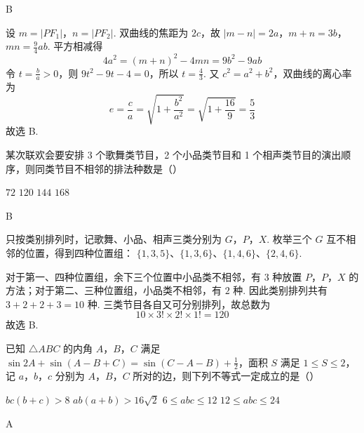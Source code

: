 \begin{answer}
B
\end{answer}

\begin{solution}
设 \(m=|PF_{1}|\)，\(n=|PF_{2}|\). 双曲线的焦距为 \(2c\)，故
\(|m-n|=2a\)，\(m+n=3b\)，\(mn=\frac{9}{4}ab\).
平方相减得
\[
4a^{2}=(m+n)^{2}-4mn=9b^{2}-9ab
\]
令 \(t=\frac{b}{a}>0\)，则 \(9t^{2}-9t-4=0\)，所以 \(t=\frac{4}{3}\). 又 \(c^{2}=a^{2}+b^{2}\)，双曲线的离心率为
\[
e=\frac{c}{a}=\sqrt{1+\frac{b^{2}}{a^{2}}}=\sqrt{1+\frac{16}{9}}=\frac{5}{3}
\]
故选 B.
\end{solution}

\begin{problem}
某次联欢会要安排 3 个歌舞类节目，2 个小品类节目和 1 个相声类节目的演出顺序，则同类节目不相邻的排法种数是（\quad）

\choices
    {\(72\)}
    {\(120\)}
    {\(144\)}
    {\(168\)}
\end{problem}

\begin{answer}
B
\end{answer}

\begin{solution}
只按类别排列时，记歌舞、小品、相声三类分别为 \(G\)，\(P\)，\(X\). 枚举三个 \(G\) 互不相邻的位置，得到四种位置组：
\(\{1,3,5\}\)、\(\{1,3,6\}\)、\(\{1,4,6\}\)、\(\{2,4,6\}\).

对于第一、四种位置组，余下三个位置中小品类不相邻，有 \(3\) 种放置 \(P\)，\(P\)，\(X\) 的方法；对于第二、三种位置组，小品类不相邻，有 \(2\) 种. 因此类别排列共有 \(3+2+2+3=10\) 种. 三类节目各自又可分别排列，故总数为
\[
10\times3!\times2!\times1!=120
\]
故选 B.
\end{solution}

\begin{problem}
已知 \(\triangle ABC\) 的内角 \(A\)，\(B\)，\(C\) 满足 \(\sin 2A + \sin (A - B + C) = \sin (C - A - B) + \frac{1}{2}\)，面积 \(S\) 满足 \(1 \leqslant S \leqslant 2\)，记 \(a\)，\(b\)，\(c\) 分别为 \(A\)，\(B\)，\(C\) 所对的边，则下列不等式一定成立的是（\quad）

\choices
    {\(bc(b + c) > 8\)}
    {\(ab(a + b) > 16\sqrt{2}\)}
    {\(6 \leqslant abc \leqslant 12\)}
    {\(12 \leqslant abc \leqslant 24\)}
\end{problem}

\begin{answer}
A
\end{answer}

